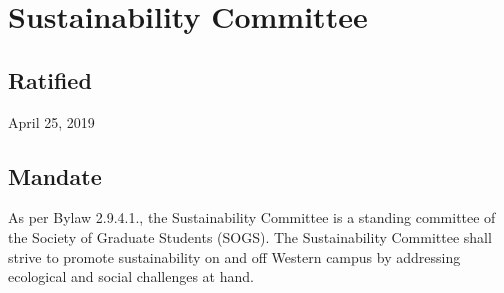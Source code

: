 \section{Sustainability Committee}

\subsection{Ratified}
April 25, 2019

\subsection{Mandate}
As per Bylaw 2.9.4.1., the Sustainability Committee is a standing committee of the Society of Graduate Students (SOGS). The Sustainability Committee shall strive to promote sustainability on and off Western campus by addressing ecological and social challenges at hand.

